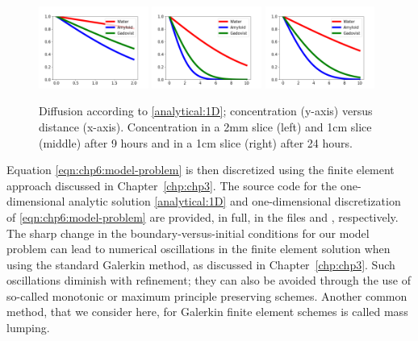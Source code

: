 \begin{figure}	
\includegraphics[width=0.32\textwidth]{./chapters/chp6/FIG/9hours_2mm_WAG}
\includegraphics[width=0.32\textwidth]{./chapters/chp6/FIG/9hours_1cm_WAG}
\includegraphics[width=0.32\textwidth]{./chapters/chp6/FIG/24hours_1cm_WAG}
\caption{
Diffusion %
according to \eqref{analytical:1D}; concentration (y-axis) 
versus distance (x-axis). Concentration in a 2mm slice (left) and 1cm slice (middle) after 9 hours and 
in a 1cm slice (right) after 24 hours. 
}
\label{fig:chp6:analytics}
\end{figure}

Equation \eqref{eqn:chp6:model-problem} is then discretized using the finite element 
approach discussed in Chapter~\ref{chp:chp3}.  The source code for the one-dimensional 
analytic solution \eqref{analytical:1D} and one-dimensional discretization of  
\eqref{eqn:chp6:model-problem} are provided, in full, in the files  
and , respectively.  The sharp change in the boundary-versus-initial 
conditions for our model problem can lead to numerical oscillations in the finite element 
solution when using the standard Galerkin method, as discussed in Chapter~\ref{chp:chp3}.  
Such oscillations diminish with refinement; they can also be avoided through the use of 
so-called monotonic or maximum principle preserving schemes.  Another common method, 
that we consider here, for Galerkin finite element schemes is called mass lumping.

